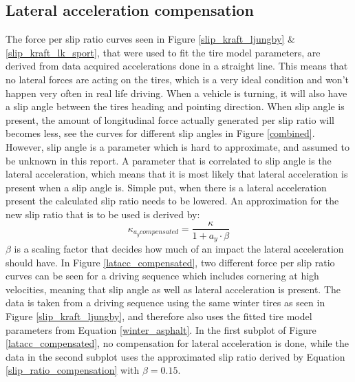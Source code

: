 \subsection{Lateral acceleration compensation}
\label{sec:latacccomp}
The force per slip ratio curves seen in Figure \ref{slip_kraft_ljungby} \& \ref{slip_kraft_lk_sport}, that were used to fit the tire model parameters, are derived from data acquired accelerations done in a straight line. This means that no lateral forces are acting on the tires, which is a very ideal condition and won't happen very often in real life driving. When a vehicle is turning, it will also have a slip angle between the tires heading and pointing direction. When slip angle is present, the amount of longitudinal force actually generated per slip ratio will becomes less, see the curves for different slip angles in Figure \ref{combined}. However, slip angle is a parameter which is hard to approximate, and assumed to be unknown in this report. A parameter that is correlated to slip angle is the lateral acceleration, which means that it is most likely that lateral acceleration is present when a slip angle is. Simple put, when there is a lateral acceleration present the calculated slip ratio needs to be lowered. An approximation for the new slip ratio that is to be used is derived by:
\begin{equation}
\label{slip_ratio_compensation}
\kappa_{a_{y} compensated} = \dfrac{\kappa}{1 + a_{y}\cdot \beta}
\end{equation}
$ \beta $ is a scaling factor that decides how much of an impact the lateral acceleration should have. In Figure \ref{latacc_compensated}, two different force per slip ratio curves can be seen for a driving sequence which includes cornering at high velocities, meaning that slip angle as well as lateral acceleration is present. The data is taken from a driving sequence using the same winter tires as seen in Figure \ref{slip_kraft_ljungby}, and therefore also uses the fitted tire model parameters from Equation \ref{winter_asphalt}. In the first subplot of Figure \ref{latacc_compensated}, no compensation for lateral acceleration is done, while the data in the second subplot uses the approximated slip ratio derived by Equation \ref{slip_ratio_compensation} with $ \beta = 0.15 $. 

